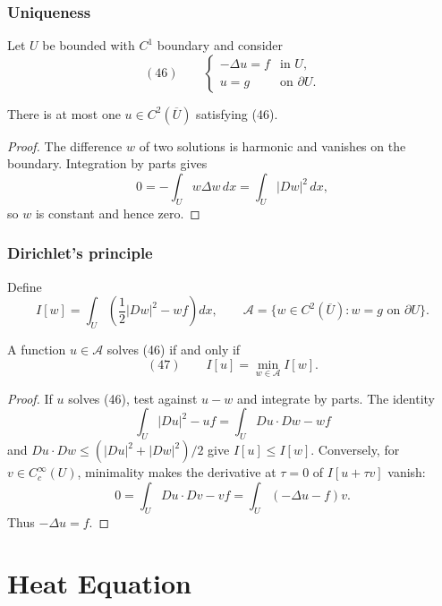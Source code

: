 \subsubsection{Uniqueness}
\label{sec:laplace-energy-uniqueness}

Let $U$ be bounded with $C^1$ boundary and consider
$$(46)\qquad
\begin{cases}
-\Delta u=f&\text{in }U,\\
u=g&\text{on }\partial U.
\end{cases}$$

\begin{theorem}[Uniqueness]
\label{thm:uniqueness-poisson-energy-method}


There is at most one $u\in C^2(\overline U)$ satisfying (46).
\end{theorem}
\begin{proof}
\sketch The difference $w$ of two solutions is harmonic and vanishes on the
boundary. Integration by parts gives
$$0=-\int_Uw\Delta w\,dx=\int_U|Dw|^2\,dx,$$
so $w$ is constant and hence zero.
\end{proof}

\subsubsection{Dirichlet's principle}
\label{sec:laplace-dirichlets-principle}

Define
$$I[w]=\int_U\left(\frac12|Dw|^2-wf\right)dx,
\qquad
\mathcal A=\{w\in C^2(\overline U):w=g\text{ on }\partial U\}.$$

\begin{theorem}
\label{thm:dirichlets-principle}
A function $u\in\mathcal A$ solves (46) if and only if
$$(47)\qquad I[u]=\min_{w\in\mathcal A}I[w].$$
\end{theorem}
\begin{proof}
\sketch If $u$ solves (46), test against $u-w$ and integrate by parts. The
identity
$$\int_U|Du|^2-uf=\int_UDu\cdot Dw-wf$$
and $Du\cdot Dw\le(|Du|^2+|Dw|^2)/2$ give $I[u]\le I[w]$. Conversely, for
$v\in C_c^\infty(U)$, minimality makes the derivative at $\tau=0$ of
$I[u+\tau v]$ vanish:
$$0=\int_U Du\cdot Dv-vf=\int_U(-\Delta u-f)v.$$
Thus $-\Delta u=f$.
\end{proof}

\section{Heat Equation}
\label{sec:heat-equation}

